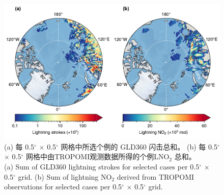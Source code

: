 \begin{figure}[!htbp]
\centering
\includegraphics[width=15cm]{./figures/arctic_lno2_production.pdf}
\caption{
(a) 每 0.5$^{\circ}$ $\times$ 0.5$^{\circ}$ 网格中所选个例的 GLD360 闪击总和。
(b) 每 0.5$^{\circ}$ $\times$ 0.5$^{\circ}$ 网格中由TROPOMI观测数据所得的个例LNO$_2$ 总和。\\
(a) Sum of GLD360 lightning strokes for selected cases per 0.5$^{\circ}$ $\times$ 0.5$^{\circ}$ grid.
(b) Sum of lightning NO$_2$ derived from TROPOMI observations for selected cases per 0.5$^{\circ}$ $\times$ 0.5$^{\circ}$ grid.
}
\label{fig:arctic_lno2_production}
\end{figure}

